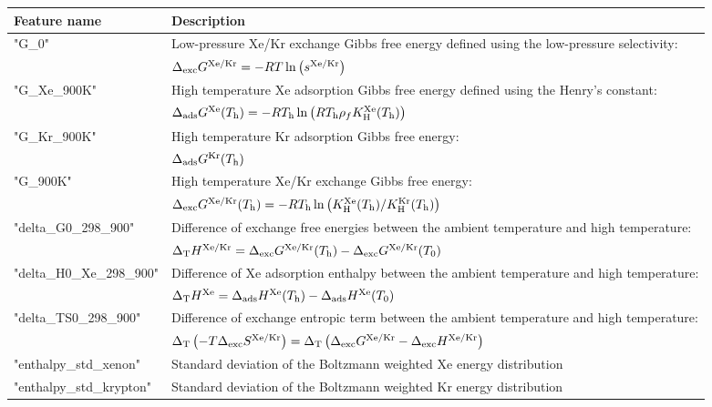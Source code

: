 \documentclass[main]{subfiles}
\begin{document}
\clearpage

  \begin{table}[ht]
  \centering
  \setlength{\extrarowheight}{1pt}
  \begin{tabular}{|l|m{10cm}|}
  \hline
   {Feature name} &  {Description} \\
  \hline
  "G\_0"  & Low-pressure Xe/Kr exchange Gibbs free energy defined using the low-pressure selectivity: \\
  & $\Delta_{\text{exc}} G^{\text{Xe/Kr}} = -RT\ln{\left(s\ensuremath{^{\text{Xe/Kr}}}\right)}$ \\
  \hline
  "G\_Xe\_900K"  & High temperature Xe adsorption Gibbs free energy defined using the Henry's constant: \\
  & $\Delta_{\text{ads}} G^{\text{Xe}} (T_{\text{h}}) = -RT_{\text{h}}\ln{\left(RT\ensuremath{_{\text{h}}}\rho_fK\ensuremath{_{\text{H}}}\ensuremath{^{\text{Xe}}}(T\ensuremath{_{\text{h}}})\right)}$ \\
  \hline
  "G\_Kr\_900K"  & High temperature Kr adsorption Gibbs free energy: \\
  & $\Delta_{\text{ads}} G^{\text{Kr}} (T_{\text{h}})$ \\
  \hline
  "G\_900K"  & High temperature Xe/Kr exchange Gibbs free energy: \\
    & $\Delta_{\text{exc}} G^{\text{Xe/Kr}} (T_{\text{h}}) = -RT_{\text{h}}\ln{\left(K\ensuremath{_{\text{H}}}\ensuremath{^{\text{Xe}}}(T\ensuremath{_{\text{h}}})/K\ensuremath{_{\text{H}}}\ensuremath{^{\text{Kr}}}(T\ensuremath{_{\text{h}}})\right)}$ \\
  \hline
  "delta\_G0\_298\_900"  & Difference of exchange free energies between the ambient temperature and high temperature: \\
  & $\Delta_{\text{T}} H^{\text{Xe/Kr}} = \Delta_{\text{exc}} G^{\text{Xe/Kr}} (T_{\text{h}})-\Delta_{\text{exc}} G^{\text{Xe/Kr}} (T_{\text{0}})$ \\
  \hline
  "delta\_H0\_Xe\_298\_900"  & Difference of Xe adsorption enthalpy between the ambient temperature and high temperature: \\
  & $\Delta_{\text{T}} H^{\text{Xe}} = \Delta_{\text{ads}} H^{\text{Xe}} (T_{\text{h}})-\Delta_{\text{ads}} H^{\text{Xe}} (T_{\text{0}})$ \\
  \hline
  "delta\_TS0\_298\_900"  & Difference of exchange entropic term between the ambient temperature and high temperature: \\
    & $\Delta_{\text{T}} \left(-T\Delta_{\text{exc}}S^{\text{Xe/Kr}}\right) = \Delta_{\text{T}} \left(\Delta_{\text{exc}}G^{\text{Xe/Kr}} - \Delta_{\text{exc}}H^{\text{Xe/Kr}}\right)$ \\
  \hline
  "enthalpy\_std\_xenon"  & Standard deviation of the Boltzmann weighted Xe energy distribution \\
  \hline
  "enthalpy\_std\_krypton"  & Standard deviation of the Boltzmann weighted Kr energy distribution \\

\end{tabular}
\end{table}
\end{document}
